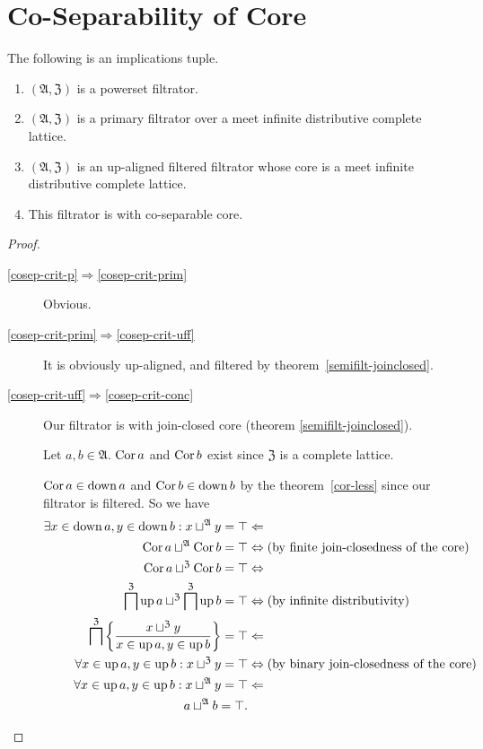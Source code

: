 \section{Co-Separability of Core}
\begin{thm}
\label{cosep-crit}The following is an implications tuple.
\begin{enumerate}
\item \label{cosep-crit-p}$(\mathfrak{A},\mathfrak{Z})$ is a powerset
filtrator.
\item \label{cosep-crit-prim}$(\mathfrak{A},\mathfrak{Z})$ is a primary
filtrator over a meet infinite distributive complete lattice.
\item \label{cosep-crit-uff}$(\mathfrak{A},\mathfrak{Z})$ is an up-aligned
filtered filtrator whose core is a meet infinite distributive complete
lattice.
\item \label{cosep-crit-conc}This filtrator is with co-separable core.
\end{enumerate}
\end{thm}
\begin{proof}
~
\begin{description}
\item [{\ref{cosep-crit-p}$\Rightarrow$\ref{cosep-crit-prim}}] Obvious.
\item [{\ref{cosep-crit-prim}$\Rightarrow$\ref{cosep-crit-uff}}] It
is obviously up-aligned, and filtered by theorem~\ref{semifilt-joinclosed}.
\item [{\ref{cosep-crit-uff}$\Rightarrow$\ref{cosep-crit-conc}}] Our
filtrator is with join-closed core (theorem \ref{semifilt-joinclosed}).


Let $a,b\in\mathfrak{A}$. $\operatorname{Cor} a$ and $\operatorname{Cor} b$ exist since $\mathfrak{Z}$
is a complete lattice.


$\operatorname{Cor} a\in\operatorname{down} a$ and $\operatorname{Cor} b\in\operatorname{down} b$ by the theorem~\ref{cor-less}
since our filtrator is filtered. So we have
\begin{align*}
\exists x\in\operatorname{down} a,y\in\operatorname{down} b:x\sqcup^{\mathfrak{A}}y=\top & \Leftarrow\\
\operatorname{Cor} a\sqcup^{\mathfrak{A}}\operatorname{Cor} b=\top & \Leftrightarrow\text{(by finite join-closedness of the core)}\\
\operatorname{Cor} a\sqcup^{\mathfrak{Z}}\operatorname{Cor} b=\top & \Leftrightarrow\\
\bigsqcap^{\mathfrak{Z}}\operatorname{up} a\sqcup^{\mathfrak{Z}}\bigsqcap^{\mathfrak{Z}}\operatorname{up} b=\top & \Leftrightarrow\text{(by infinite distributivity)}\\
\bigsqcap^{\mathfrak{Z}}\left\{ \frac{x\sqcup^{\mathfrak{Z}}y}{x\in\operatorname{up} a,y\in\operatorname{up} b}\right\}=\top & \Leftarrow\\
\forall x\in\operatorname{up} a,y\in\operatorname{up} b:x\sqcup^{\mathfrak{Z}}y=\top & \Leftrightarrow\text{(by binary join-closedness of the core)}\\
\forall x\in\operatorname{up} a,y\in\operatorname{up} b:x\sqcup^{\mathfrak{A}}y=\top & \Leftarrow\\
a\sqcup^{\mathfrak{A}}b=\top.
\end{align*}


\end{description}
\end{proof}

